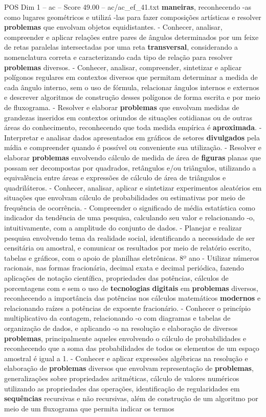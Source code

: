\begin{textsample}{POS Dim 1 – ac – Score 49.00 – ac/ac\_ef\_41.txt}
\textbf{maneiras}, reconhecendo -as como lugares geométricos e utilizá -las para fazer composições artísticas e resolver \textbf{problemas} que envolvam objetos equidistantes. - Conhecer, analisar, compreender e aplicar relações entre pares de ângulos determinados por um feixe de retas paralelas intersectadas por uma reta \textbf{transversal}, considerando a nomenclatura correta e caracterizando cada tipo de relação para resolver \textbf{problemas} diversos. - Conhecer, analisar, compreender, sintetizar e aplicar polígonos regulares em contextos diversos que permitam determinar a medida de cada ângulo interno, sem o uso de fórmula, relacionar ângulos internos e externos e descrever algoritmos de construção desses polígonos de forma escrita e por meio de fluxograma. - Resolver e elaborar \textbf{problemas} que envolvam medidas de grandezas inseridos em contextos oriundos de situações cotidianas ou de outras áreas do conhecimento, reconhecendo que toda medida empírica é \textbf{aproximada}. - Interpretar e analisar dados apresentados em gráficos de setores \textbf{divulgados} pela mídia e compreender quando é possível ou conveniente sua utilização. - Resolver e elaborar \textbf{problemas} envolvendo cálculo de medida de área de \textbf{figuras} planas que possam ser decompostas por quadrados, retângulos e/ou triângulos, utilizando a equivalência entre áreas e expressões de cálculo de área de triângulos e quadriláteros. - Conhecer, analisar, aplicar e sintetizar experimentos aleatórios em situações que envolvam cálculo de probabilidades ou estimativas por meio de frequência de ocorrência. - Compreender o significado de média estatística como indicador da tendência de uma pesquisa, calculando seu valor e relacionando -o, intuitivamente, com a amplitude do conjunto de dados. - Planejar e realizar pesquisa envolvendo tema da realidade social, identificando a necessidade de ser censitária ou amostral, e comunicar os resultados por meio de relatório escrito, tabelas e gráficos, com o apoio de planilhas eletrônicas. 8º ano - Utilizar números racionais, nas formas fracionária, decimal exata e decimal periódica, fazendo aplicações de notação científica, propriedades das potências, cálculos de porcentagens com e sem o uso de \textbf{tecnologias} \textbf{digitais} em \textbf{problemas} diversos, reconhecendo a importância das potências nos cálculos matemáticos \textbf{modernos} e relacionando raízes a potências de expoente fracionário. - Conhecer o princípio multiplicativo da contagem, relacionando -o com diagramas e tabelas de organização de dados, e aplicando -o na resolução e elaboração de diversos \textbf{problemas}, principalmente aqueles envolvendo o cálculo de probabilidades e reconhecendo que a soma das probabilidades de todos os elementos de um espaço amostral é igual a 1. - Conhecer e aplicar expressões algébricas na resolução e elaboração de \textbf{problemas} diversos que envolvam representação de \textbf{problemas}, generalizações sobre propriedades aritméticas, cálculo de valores numéricos utilizando as propriedades das operações, identificação de regularidades em \textbf{sequências} recursivas e não recursivas, além de construção de um algoritmo por meio de um fluxograma que permita indicar os termos 
\end{textsample}
